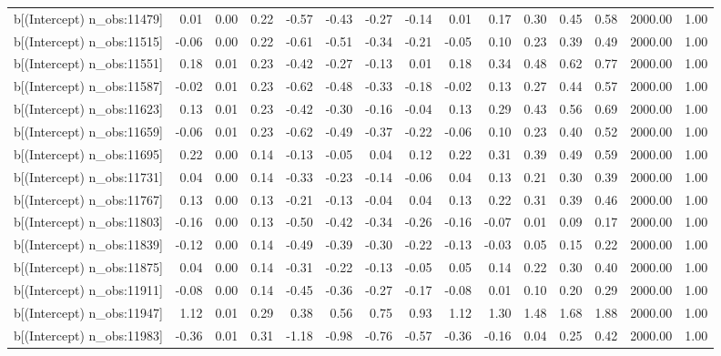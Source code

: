\begin{table}[ht]
\begin{tabular}{rrrrrrrrrrrrrrr}
  b[(Intercept) n\_obs:11479] & 0.01 & 0.00 & 0.22 & -0.57 & -0.43 & -0.27 & -0.14 & 0.01 & 0.17 & 0.30 & 0.45 & 0.58 & 2000.00 & 1.00 \\ 
  b[(Intercept) n\_obs:11515] & -0.06 & 0.00 & 0.22 & -0.61 & -0.51 & -0.34 & -0.21 & -0.05 & 0.10 & 0.23 & 0.39 & 0.49 & 2000.00 & 1.00 \\ 
  b[(Intercept) n\_obs:11551] & 0.18 & 0.01 & 0.23 & -0.42 & -0.27 & -0.13 & 0.01 & 0.18 & 0.34 & 0.48 & 0.62 & 0.77 & 2000.00 & 1.00 \\ 
  b[(Intercept) n\_obs:11587] & -0.02 & 0.01 & 0.23 & -0.62 & -0.48 & -0.33 & -0.18 & -0.02 & 0.13 & 0.27 & 0.44 & 0.57 & 2000.00 & 1.00 \\ 
  b[(Intercept) n\_obs:11623] & 0.13 & 0.01 & 0.23 & -0.42 & -0.30 & -0.16 & -0.04 & 0.13 & 0.29 & 0.43 & 0.56 & 0.69 & 2000.00 & 1.00 \\ 
  b[(Intercept) n\_obs:11659] & -0.06 & 0.01 & 0.23 & -0.62 & -0.49 & -0.37 & -0.22 & -0.06 & 0.10 & 0.23 & 0.40 & 0.52 & 2000.00 & 1.00 \\ 
  b[(Intercept) n\_obs:11695] & 0.22 & 0.00 & 0.14 & -0.13 & -0.05 & 0.04 & 0.12 & 0.22 & 0.31 & 0.39 & 0.49 & 0.59 & 2000.00 & 1.00 \\ 
  b[(Intercept) n\_obs:11731] & 0.04 & 0.00 & 0.14 & -0.33 & -0.23 & -0.14 & -0.06 & 0.04 & 0.13 & 0.21 & 0.30 & 0.39 & 2000.00 & 1.00 \\ 
  b[(Intercept) n\_obs:11767] & 0.13 & 0.00 & 0.13 & -0.21 & -0.13 & -0.04 & 0.04 & 0.13 & 0.22 & 0.31 & 0.39 & 0.46 & 2000.00 & 1.00 \\ 
  b[(Intercept) n\_obs:11803] & -0.16 & 0.00 & 0.13 & -0.50 & -0.42 & -0.34 & -0.26 & -0.16 & -0.07 & 0.01 & 0.09 & 0.17 & 2000.00 & 1.00 \\ 
  b[(Intercept) n\_obs:11839] & -0.12 & 0.00 & 0.14 & -0.49 & -0.39 & -0.30 & -0.22 & -0.13 & -0.03 & 0.05 & 0.15 & 0.22 & 2000.00 & 1.00 \\ 
  b[(Intercept) n\_obs:11875] & 0.04 & 0.00 & 0.14 & -0.31 & -0.22 & -0.13 & -0.05 & 0.05 & 0.14 & 0.22 & 0.30 & 0.40 & 2000.00 & 1.00 \\ 
  b[(Intercept) n\_obs:11911] & -0.08 & 0.00 & 0.14 & -0.45 & -0.36 & -0.27 & -0.17 & -0.08 & 0.01 & 0.10 & 0.20 & 0.29 & 2000.00 & 1.00 \\ 
  b[(Intercept) n\_obs:11947] & 1.12 & 0.01 & 0.29 & 0.38 & 0.56 & 0.75 & 0.93 & 1.12 & 1.30 & 1.48 & 1.68 & 1.88 & 2000.00 & 1.00 \\ 
  b[(Intercept) n\_obs:11983] & -0.36 & 0.01 & 0.31 & -1.18 & -0.98 & -0.76 & -0.57 & -0.36 & -0.16 & 0.04 & 0.25 & 0.42 & 2000.00 & 1.00 \\ 

\end{tabular}
\end{table}
